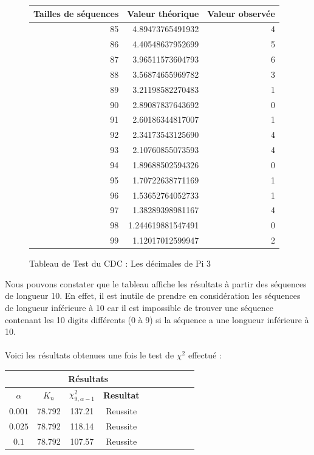 \documentclass[french]{article}
\begin{document}
\begin{figure}[h!]
	\centering
	\begin{tabular}{|r|r|r|}
		\hline
		Tailles de séquences & Valeur théorique & Valeur observée\\
		\hline
		85 & 4.89473765491932 & 4\\
		86 & 4.40548637952699 & 5\\
		87 & 3.96511573604793 & 6\\
		88 & 3.56874655969782 & 3\\
		89 & 3.21198582270483 & 1\\
		90 & 2.89087837643692 & 0\\
		91 & 2.60186344817007 & 1\\
		92 & 2.34173543125690 & 4\\
		93 & 2.10760855073593 & 4\\
		94 & 1.89688502594326 & 0\\
		95 & 1.70722638771169 & 1\\
		96 & 1.53652764052733 & 1\\
		97 & 1.38289398981167 & 4\\
		98 & 1.244619881547491 & 0\\
		99 & 1.12017012599947 & 2\\
		\hline
	\end{tabular}
	\caption{Tableau de Test du CDC : Les décimales de Pi 3}
\end{figure}
\newpage
Nous pouvons constater que le tableau affiche les résultats à partir des séquences de longueur 10. En effet, il est inutile de prendre en considération les séquences de longueur inférieure à 10 car il est impossible de trouver une séquence contenant les 10 digits différents (0 à 9) si la séquence a une longueur inférieure à 10.
\\
\\
Voici les résultats obtenues une fois le test de $\chi^{2}$ effectué :
\begin{longtable}{|c|c|c|c|c|c|c|c|c|c|}
	\hline
	& \multicolumn{3}{c|}{\textbf{Résultats}} \\ 
	\hline 
	\textbf{$\alpha$}  & $K_{n}$ & $\chi^{2}_{9,\alpha-1}$ & \textbf{Resultat} \\ 
	\hline 
	$$0.001$$ & 78.792 & 137.21 & Reussite\\ 
	\hline 
	$$0.025$$ & 78.792 & 118.14 & Reussite\\ 
	\hline 
	$$0.1$$ & 78.792 & 107.57 & Reussite \\ 
	\hline 
\end{longtable}
\end{document}
